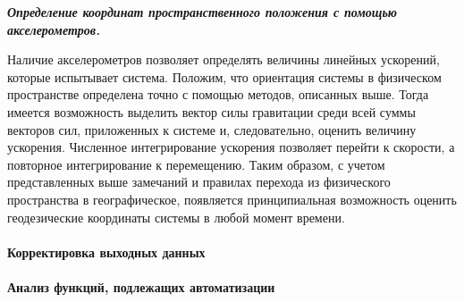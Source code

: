 \textit{\textbf{Определение координат пространственного положения с помощью акселерометров.}}

Наличие акселерометров позволяет определять величины линейных ускорений, которые испытывает система. Положим, что ориентация системы в физическом пространстве определена точно с помощью методов, описанных выше. Тогда имеется возможность выделить вектор силы гравитации среди всей суммы векторов сил, приложенных к системе и, следовательно, оценить величину ускорения. Численное интегрирование ускорения позволяет перейти к скорости, а повторное интегрирование к перемещению. Таким образом, с учетом представленных выше замечаний и правилах перехода из физического пространства в географическое, появляется принципиальная возможность оценить геодезические координаты системы в любой момент времени.

\paragraph{Корректировка выходных данных}

\paragraph{Анализ функций, подлежащих автоматизации}

